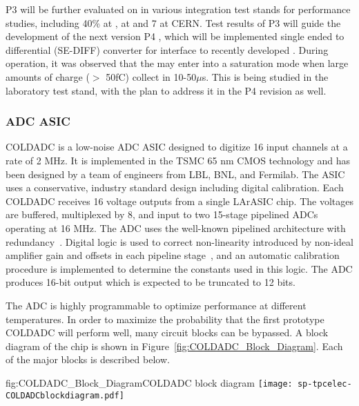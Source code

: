 P3   will be further evaluated on  in various integration test stands for performance studies, including 40\%  at ,   at  and 7 at CERN. Test results of P3   will guide the development of the next version P4  , which will be implemented single ended to differential (SE-DIFF) converter for interface to recently developed  . During  operation, it was observed that the   may enter into a saturation mode when large amounts of charge ($>$ 50fC) collect in 10-50$\mu$s. This is being studied in the laboratory test stand, with the plan to address it in the P4   revision as well.

\subsubsection{ADC ASIC}
\label{sec:fdsp-tpcelec-design-femb-adc}

COLDADC is a low-noise ADC ASIC designed to digitize 16 input channels at a rate of 2 MHz. It is implemented in the TSMC 65 nm CMOS technology and has been designed by a team of engineers from LBL, BNL, and Fermilab.  The ASIC uses a conservative, industry standard design including digital calibration.  Each COLDADC receives 16 voltage outputs from a single LArASIC chip.  The voltages are buffered, multiplexed by 8, and input to two 15-stage pipelined ADCs operating at 16 MHz.  The ADC uses the well-known pipelined architecture with redundancy~\cite{PipelinedADC}.  Digital logic is used to correct non-linearity introduced by non-ideal amplifier gain and offsets in each pipeline stage~\cite{CalibrationCorrection}, and an automatic calibration procedure is implemented to determine the constants used in this logic.  The ADC produces 16-bit output which is expected to be truncated to 12 bits.

The ADC is highly programmable to optimize performance at different temperatures.
In order to maximize the probability that the first prototype COLDADC will perform well, many circuit blocks can be bypassed.  A block diagram of the chip is shown in Figure~\ref{fig:COLDADC_Block_Diagram}.  Each of the major blocks is described below.

\begin{dunefigure}{fig:COLDADC_Block_Diagram}{COLDADC block diagram}
\texttt{[image: sp-tpcelec-COLDADCblockdiagram.pdf]}
\end{dunefigure}

